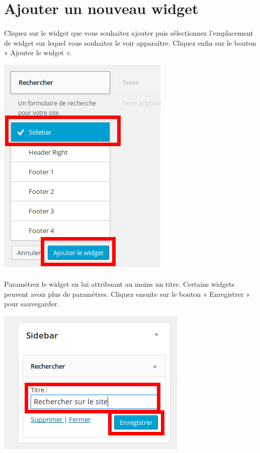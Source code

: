 \documentclass[10pt,a4paper]{article}
\begin{document}
\section{Ajouter un nouveau widget}
\paragraph{}Cliquez sur le widget que vous souhaitez ajouter puis sélectionnez l'emplacement de widget sur lequel vous souhaitez le voir apparaître. Cliquez enfin sur le bouton « Ajouter le widget ».
\begin{center}
\includegraphics[scale=0.3]{img/0254.png}
\end{center}
\paragraph{}Paramétrez le widget en lui attribuant au moins un titre. Certains widgets peuvent avoir plus de paramètres. Cliquez ensuite sur le bouton « Enregistrer » pour sauvegarder.
\begin{center}
\includegraphics[scale=0.3]{img/0255.png}
\end{center}
\end{document}
